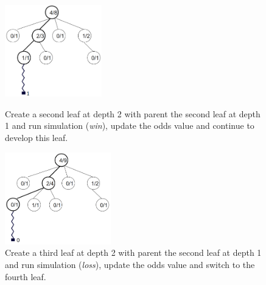 \begin{figure}[H]
\centering
	\begin{minipage}[b]{0.45\linewidth}
		\centering
		\includegraphics[height=4cm]{1_Presentation/1.2_Algorithm_MCTS_Benoit/img/8.png}
		\caption{\label{fig:8}Create a second leaf at depth 2 with parent the second leaf at depth 1 and run simulation (\textit{win}), update the odds value and continue to develop this leaf.}
	\end{minipage}%
	\hspace*{1cm}
	\begin{minipage}[b]{0.45\linewidth}
		\centering
		\includegraphics[height=4cm]{1_Presentation/1.2_Algorithm_MCTS_Benoit/img/9.png}
		\caption{\label{fig:9}Create a third leaf at depth 2 with parent the second leaf at depth 1 and run simulation (\textit{loss}), update the odds value and switch to the fourth leaf.\null\\}
	\end{minipage}%
\end{figure}

